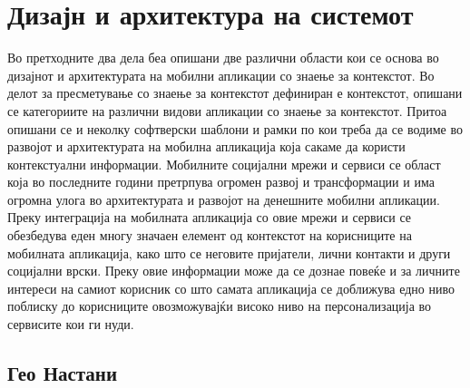 \chapter{Дизајн и архитектура на системот} 

Во претходните два дела беа опишани две различни области кои се основа во
дизајнот и архитектурата на мобилни апликации со знаење за контекстот. Во делот
за пресметување со знаење за контекстот дефиниран е контекстот, опишани се
категориите на различни видови апликации со знаење за контекстот. Притоа опишани
се и неколку софтверски шаблони и рамки по кои треба да се водиме во развојот и
архитектурата на мобилна апликација која сакаме да користи контекстуални
информации. Мобилните социјални мрежи и сервиси се област која во последните
години претрпува огромен развој и трансформации и има огромна улога во
архитектурата и развојот на денешните мобилни апликации. Преку интеграција на
мобилната апликација со овие мрежи и сервиси се обезбедува еден многу значаен
елемент од контекстот на корисниците на мобилната апликација, како што се
неговите пријатели, лични контакти и други социјални врски. Преку овие
информации може да се дознае повеќе и за личните интереси на самиот корисник со
што самата апликација се доближува едно ниво поблиску до корисниците
овозможувајќи високо ниво на персонализација во сервисите кои ги нуди.

\section{Гео Настани} 

